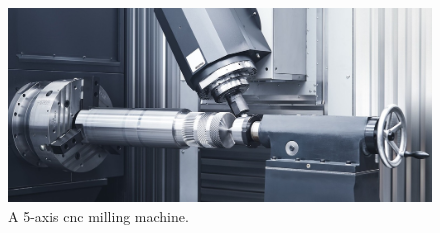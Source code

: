 \begin{figure}
  \centering
  \includegraphics[width=.7\textwidth]{images/Framework/millmachine.jpg}
  \caption{A 5-axis \gls{cnc} milling machine. \cite{FagorAutomation}}
  \label{fig:cnc}
\end{figure}



